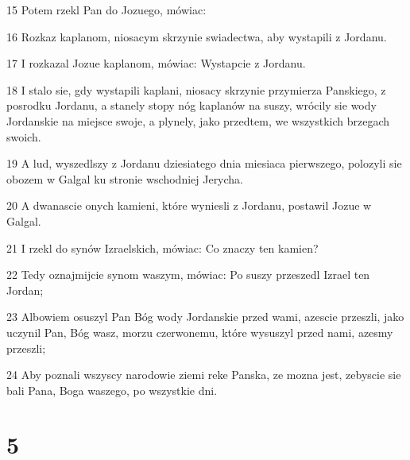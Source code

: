 \par 15 Potem rzekl Pan do Jozuego, mówiac:
\par 16 Rozkaz kaplanom, niosacym skrzynie swiadectwa, aby wystapili z Jordanu.
\par 17 I rozkazal Jozue kaplanom, mówiac: Wystapcie z Jordanu.
\par 18 I stalo sie, gdy wystapili kaplani, niosacy skrzynie przymierza Panskiego, z posrodku Jordanu, a stanely stopy nóg kaplanów na suszy, wrócily sie wody Jordanskie na miejsce swoje, a plynely, jako przedtem, we wszystkich brzegach swoich.
\par 19 A lud, wyszedlszy z Jordanu dziesiatego dnia miesiaca pierwszego, polozyli sie obozem w Galgal ku stronie wschodniej Jerycha.
\par 20 A dwanascie onych kamieni, które wyniesli z Jordanu, postawil Jozue w Galgal.
\par 21 I rzekl do synów Izraelskich, mówiac: Co znaczy ten kamien?
\par 22 Tedy oznajmijcie synom waszym, mówiac: Po suszy przeszedl Izrael ten Jordan;
\par 23 Albowiem osuszyl Pan Bóg wody Jordanskie przed wami, azescie przeszli, jako uczynil Pan, Bóg wasz, morzu czerwonemu, które wysuszyl przed nami, azesmy przeszli;
\par 24 Aby poznali wszyscy narodowie ziemi reke Panska, ze mozna jest, zebyscie sie bali Pana, Boga waszego, po wszystkie dni.

\chapter{5}

